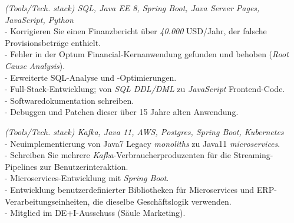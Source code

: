 \documentclass[]{CV-JuanCamiloFlorez}
\begin{document}
\begin{minipage}[t]{0.66\textwidth}
    \noindent
    \textit{(Tools/Tech. stack) SQL, Java EE 8, Spring Boot, Java Server Pages, JavaScript, Python} \\
        - Korrigieren Sie einen Finanzbericht über \textit{40.000} USD/Jahr, der falsche Provisionsbeträge enthielt. \\
        - Fehler in der Optum Financial-Kernanwendung gefunden und behoben (\textit{Root Cause Analysis}). \\
        - Erweiterte SQL-Analyse und -Optimierungen. \\
        - Full-Stack-Entwicklung; von \textit{SQL DDL/DML} zu \textit{JavaScript} Frontend-Code. \\
        - Softwaredokumentation schreiben. \\
        - Debuggen und Patchen dieser über 15 Jahre alten Anwendung. \\
        \sectionsep

    \noindent
    \textit{(Tools/Tech. stack) Kafka, Java 11, AWS, Postgres, Spring Boot, Kubernetes} \\
        - Neuimplementierung von Java7 Legacy \textit{monoliths} zu Java11 \textit{microservices}. \\
        - Schreiben Sie mehrere \textit{Kafka}-Verbraucherproduzenten für die Streaming-Pipelines zur Benutzerinteraktion. \\
        - Microservices-Entwicklung mit \textit{Spring Boot}. \\
        - Entwicklung benutzerdefinierter Bibliotheken für Microservices und ERP-Verarbeitungseinheiten, die dieselbe Geschäftslogik verwenden. \\
        - Mitglied im DE+I-Ausschuss (Säule Marketing). \\
        \sectionsep


\end{minipage}
\end{document}
